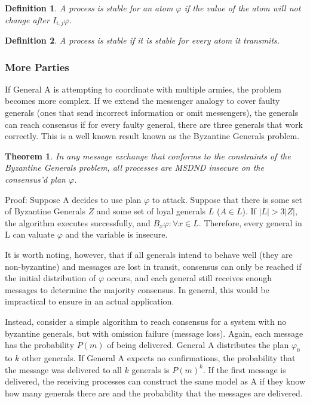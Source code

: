 \documentclass[12pt,oneside]{article}
\newtheorem{thm}{Theorem}
\newtheorem{pdef}{Definition}
\begin{document}
\begin{pdef}
A process is stable for an atom $\varphi$ if the value of the atom will not change after $I_{i,j} \varphi$.
\end{pdef}

\begin{pdef}
A process is stable if it is stable for every atom it transmits.
\end{pdef}


\subsubsection{More Parties}

If General A is attempting to coordinate with multiple armies, the problem becomes more complex. If we extend the messenger analogy to cover faulty generals (ones that send incorrect information or omit messengers), the generals can reach consensus if for every faulty general, there are three generals that work correctly. This is a well known result known as the Byzantine Generals problem.

\begin{thm}
In any message exchange that conforms to the constraints of the Byzantine Generals problem, all processes are MSDND insecure on the consensus'd plan $\varphi$.
\end{thm}

Proof: Suppose A decides to use plan $\varphi$ to attack. Suppose that there is some set of Byzantine Generals $Z$ and some set of loyal generals $L$ ($A \in L$). If $|L| > 3|Z|$, the algorithm executes successfully, and $B_x \varphi : \forall x \in L $. Therefore, every general in L can valuate $\varphi$ and the variable is insecure.

It is worth noting, however, that if all generals intend to behave well (they are non-byzantine) and messages are lost in transit, consensus can only be reached if the initial distribution of $\varphi$ occurs, and each general still receives enough messages to determine the majority consensus. In general, this would be impractical to ensure in an actual application.

Instead, consider a simple algorithm to reach consensus for a system with no byzantine generals, but with omission failure (message loss). Again, each message has the probability $P(m)$ of being delivered. General A distributes the plan $\varphi_0$ to $k$ other generals. If General A expects no confirmations, the probability that the message was delivered to all $k$ generals is $P(m)^k$. If the first message is delivered, the receiving processes can construct the same model as A if they know how many generals there are and the probability that the messages are delivered. 
\end{document}
